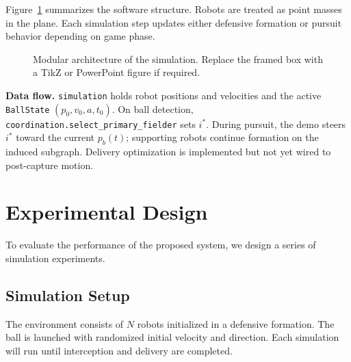 \documentclass[conference]{IEEEtran}
\begin{document}
Figure~\ref{fig:arch} summarizes the software structure. Robots are treated as point masses in the plane. Each simulation step updates either defensive formation or pursuit behavior depending on game phase.

\begin{figure}[htbp]
\centering
{}
\caption{Modular architecture of the simulation. Replace the framed box with a TikZ or PowerPoint figure if required.}
\label{fig:arch}
\end{figure}

\noindent\textbf{Data flow.} \texttt{simulation} holds robot positions and velocities and the active \texttt{BallState} $(p_0, v_0, a, t_0)$. On ball detection, \texttt{coordination.select\_primary\_fielder} sets $i^*$. During pursuit, the demo steers $i^*$ toward the current $p_b(t)$; supporting robots continue formation on the induced subgraph. Delivery optimization is implemented but not yet wired to post-capture motion.

\section{Experimental Design}

To evaluate the performance of the proposed system, we design a series of simulation experiments.

\subsection{Simulation Setup}

The environment consists of $N$ robots initialized in a defensive formation. The ball is launched with randomized initial velocity and direction. Each simulation will run until interception and delivery are completed.
\end{document}
